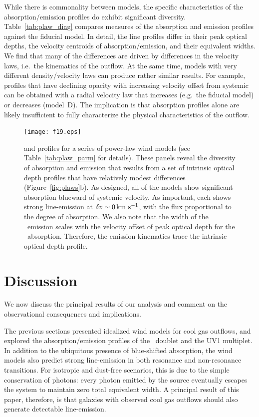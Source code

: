 \documentclass[]{emulateapj}
\begin{document}
While there is commonality between models, the specific
characteristics of the absorption/emission profiles do exhibit
significant diversity.
Table~\ref{tab:plaw_diag} compares measures of the absorption and
emission profiles against the fiducial model.
In detail, the line profiles differ in their peak optical depths,
the velocity centroids of absorption/emission, and their equivalent widths.
We find that many of the differences are driven by differences in
the velocity laws, i.e.\ the kinematics of the outflow.
At the same time, models with very different density/velocity laws can
produce rather similar results.  For example, profiles that have declining
opacity with increasing velocity offset from systemic can be obtained
with a radial velocity law that increases (e.g.\ the fiducial model)
or decreases (model~D).  The implication is that absorption profiles
alone are likely insufficient to fully characterize the physical
characteristics of the outflow.

\begin{figure}
\texttt{[image: f19.eps]}
\caption{
 and  profiles for a series of power-law wind
models (see Table~\ref{tab:plaw_parm} for details).  These panels reveal
the diversity of absorption and emission that results from a set of
intrinsic optical depth profiles that have relatively modest
differences (Figure~\ref{fig:plaws}b).  As designed, all of the models
show significant absorption blueward of systemic velocity.  As
important, each shows strong line-emission at $\delta v \sim 0 \, {\rm km~s^{-1}}$,
with the flux proportional to the degree of absorption.
We also note that the width of the \feiic\ emission scales with the
velocity offset of peak optical depth for the \feiia\ absorption.
Therefore, the emission kinematics trace the intrinsic
optical depth profile.
}
\label{fig:plaws_spec}
\end{figure}


\section{Discussion}
\label{sec:discuss}

We now discuss the principal results of our analysis and comment on
the observational consequences and implications. 

The previous sections presented idealized wind models for
cool gas outflows, and explored the absorption/emission profiles of
the \mgiid\ doublet and the  UV1 multiplet.  In addition to
the ubiquitous presence of blue-shifted absorption, the wind models
also predict strong line-emission in both resonance
and non-resonance transitions.  For isotropic and dust-free scenarios,
this is 
due to the 
simple conservation of photons: every photon emitted by
the source eventually escapes the system to maintain
zero total equivalent width. A principal result of this paper,
therefore, is that galaxies with observed cool gas outflows should
also generate detectable line-emission.
 
\end{document}

